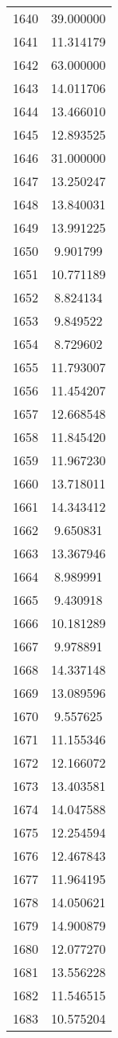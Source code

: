 \documentclass[12pt]{article}
\begin{document}
\begin{longtable}{@{}cc@{}}
1640 & 39.000000 \\
1641 & 11.314179 \\
1642 & 63.000000 \\
1643 & 14.011706 \\
1644 & 13.466010 \\
1645 & 12.893525 \\
1646 & 31.000000 \\
1647 & 13.250247 \\
1648 & 13.840031 \\
1649 & 13.991225 \\
1650 & 9.901799 \\
1651 & 10.771189 \\
1652 & 8.824134 \\
1653 & 9.849522 \\
1654 & 8.729602 \\
1655 & 11.793007 \\
1656 & 11.454207 \\
1657 & 12.668548 \\
1658 & 11.845420 \\
1659 & 11.967230 \\
1660 & 13.718011 \\
1661 & 14.343412 \\
1662 & 9.650831 \\
1663 & 13.367946 \\
1664 & 8.989991 \\
1665 & 9.430918 \\
1666 & 10.181289 \\
1667 & 9.978891 \\
1668 & 14.337148 \\
1669 & 13.089596 \\
1670 & 9.557625 \\
1671 & 11.155346 \\
1672 & 12.166072 \\
1673 & 13.403581 \\
1674 & 14.047588 \\
1675 & 12.254594 \\
1676 & 12.467843 \\
1677 & 11.964195 \\
1678 & 14.050621 \\
1679 & 14.900879 \\
1680 & 12.077270 \\
1681 & 13.556228 \\
1682 & 11.546515 \\
1683 & 10.575204 \\

\end{longtable}
\end{document}
